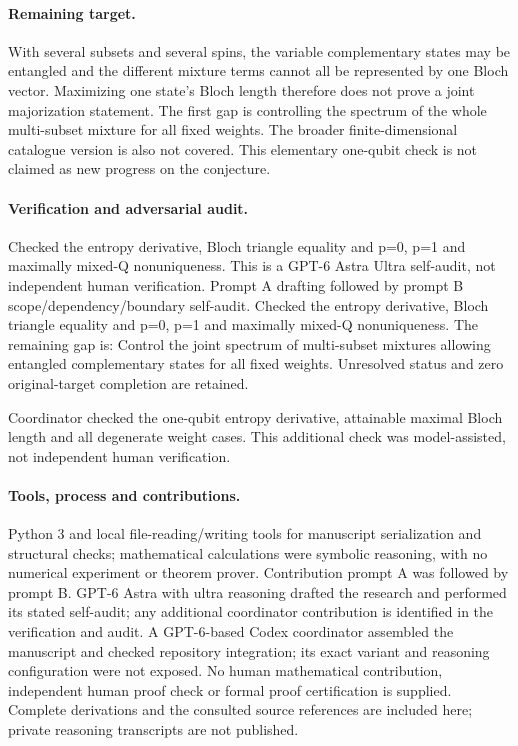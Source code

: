 \documentclass[11pt]{article}
\begin{document}
\paragraph{Remaining target.} With several subsets and several spins, the variable complementary states may be entangled and the different mixture terms cannot all be represented by one Bloch vector. Maximizing one state's Bloch length therefore does not prove a joint majorization statement. The first gap is controlling the spectrum of the whole multi-subset mixture for all fixed weights. The broader finite-dimensional catalogue version is also not covered. This elementary one-qubit check is not claimed as new progress on the conjecture.

\paragraph{Verification and adversarial audit.}
Checked the entropy derivative, Bloch triangle equality and p=0, p=1 and maximally mixed-Q nonuniqueness. This is a GPT-6 Astra Ultra self-audit, not independent human verification. Prompt A drafting followed by prompt B scope/dependency/boundary self-audit. Checked the entropy derivative, Bloch triangle equality and p=0, p=1 and maximally mixed-Q nonuniqueness. The remaining gap is: Control the joint spectrum of multi-subset mixtures allowing entangled complementary states for all fixed weights. Unresolved status and zero original-target completion are retained.

Coordinator checked the one-qubit entropy derivative, attainable maximal Bloch length and all degenerate weight cases. This additional check was model-assisted, not independent human verification.

\paragraph{Tools, process and contributions.}
Python 3 and local file-reading/writing tools for manuscript serialization and structural checks; mathematical calculations were symbolic reasoning, with no numerical experiment or theorem prover. Contribution prompt A was followed by prompt B. GPT-6 Astra with ultra reasoning drafted the research and performed its stated self-audit; any additional coordinator contribution is identified in the verification and audit. A GPT-6-based Codex coordinator assembled the manuscript and checked repository integration; its exact variant and reasoning configuration were not exposed. No human mathematical contribution, independent human proof check or formal proof certification is supplied. Complete derivations and the consulted source references are included here; private reasoning transcripts are not published.
\end{document}

